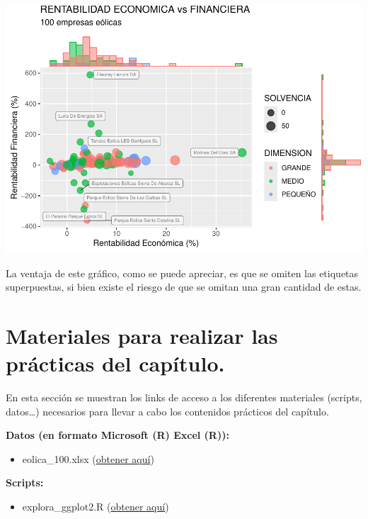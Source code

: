 \documentclass[
]{book}
\providecommand{\tightlist}{%
  \setlength{\itemsep}{0pt}\setlength{\parskip}{0pt}}
\let\Oldincludegraphics\includegraphics
\renewcommand{\includegraphics}[2][]{%
  \Oldincludegraphics[#1]{#2}%
}
\begin{document}
\includegraphics{_main_files/figure-latex/unnamed-chunk-124-1.pdf}

La ventaja de este gráfico, como se puede apreciar, es que se omiten las etiquetas superpuestas, si bien existe el riesgo de que se omitan una gran cantidad de estas.

\section{Materiales para realizar las prácticas del capítulo.}\label{materiales-para-realizar-las-pruxe1cticas-del-capuxedtulo.-1}

En esta sección se muestran los links de acceso a los diferentes materiales (scripts, datos\ldots) necesarios para llevar a cabo los contenidos prácticos del capítulo.

\textbf{Datos (en formato Microsoft (R) Excel (R)):}

\begin{itemize}
\tightlist
\item
  eolica\_100.xlsx (\href{https://docs.google.com/spreadsheets/d/1Up5ZWR57rgIkmYJcr2Pek6kUdG_yd4vu/edit?usp=drive_link&ouid=115375878280465826079&rtpof=true&sd=true}{obtener aquí})
\end{itemize}

\textbf{Scripts:}

\begin{itemize}
\tightlist
\item
  explora\_ggplot2.R (\href{https://drive.google.com/file/d/1Is4XOd6EmFswB6w2eZfC8_pp2mtu7aQK/view?usp=drive_link}{obtener aquí})
\end{itemize}
\end{document}
